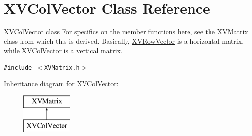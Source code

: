 \hypertarget{class_XVColVector}{
\section{XVCol\-Vector  Class Reference}
\label{XVColVector}
}
XVCol\-Vector class For specifics on the member functions here, see the XVMatrix class from which this is derived. Basically, \hyperlink{class_XVRowVector}{XVRow\-Vector} is a horizontal matrix, while XVCol\-Vector is a vertical matrix. 


{\tt \#include $<$XVMatrix.h$>$}

Inheritance diagram for XVCol\-Vector:\begin{figure}[H]
\begin{center}
\leavevmode
\includegraphics[height=2cm]{class_XVColVector}
\end{center}
\end{figure}
